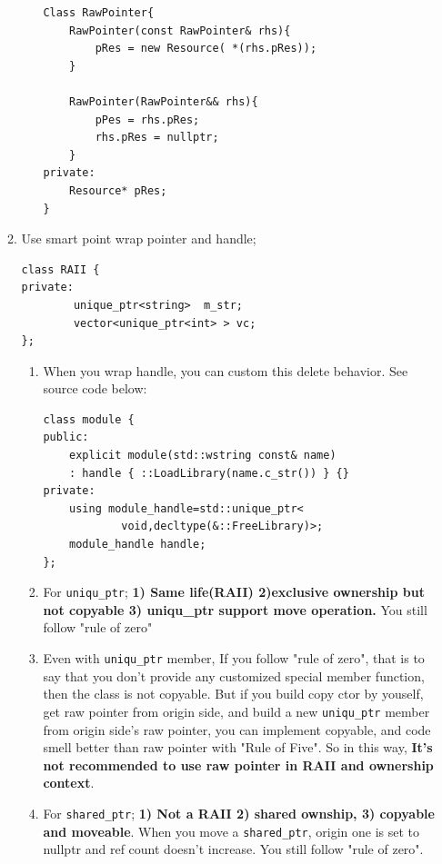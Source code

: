 \documentclass[a4paper,11pt,twoside]{book}
\begin{document}
\begin{itemize}
\begin{enumerate}
\begin{enumerate}
\begin{lstlisting}[numbers=none]
Class RawPointer{
	RawPointer(const RawPointer& rhs){
		pRes = new Resource( *(rhs.pRes));
	}
				
	RawPointer(RawPointer&& rhs){
		pPes = rhs.pRes;
		rhs.pRes = nullptr;
	}
private:
	Resource* pRes;
}
\end{lstlisting}
			\end{enumerate}
		
		\item Use smart point wrap pointer and handle;
\begin{lstlisting}[numbers=none]
class RAII {
private:
		unique_ptr<string>  m_str;
		vector<unique_ptr<int> > vc;
};
		\end{lstlisting}
\begin{enumerate}
	\item  When you wrap handle, you can custom this delete behavior. See source code below:
\begin{lstlisting}[numbers=none]
class module {
public:
	explicit module(std::wstring const& name)
	: handle { ::LoadLibrary(name.c_str()) } {}
private:
	using module_handle=std::unique_ptr<
			void,decltype(&::FreeLibrary)>;
	module_handle handle;
};
\end{lstlisting}
			\item For \texttt{uniqu\_ptr}; \textbf{1) Same life(RAII) 2)exclusive ownership but not copyable 3) uniqu\_ptr support move operation. } You still follow "rule of zero"

			\item Even with \texttt{uniqu\_ptr} member, If you follow "rule of zero", that is to say that you don't provide any customized special member function, then the class is not copyable. But if you build copy ctor by youself, get raw pointer from origin side, and build a new \texttt{uniqu\_ptr} member from origin side's raw pointer, you can implement copyable, and code smell better than raw pointer with "Rule of Five". So in this way, \textbf{It's not recommended to use raw pointer in RAII and ownership context}.

			\item For \texttt{shared\_ptr}; \textbf{1) Not a RAII 2) shared ownship, 3) copyable and moveable}. When you move a \texttt{shared\_ptr}, origin one is set to nullptr and ref count doesn't increase.  You still follow "rule of zero".
\end{enumerate}

	\end{enumerate}


\end{itemize}
\end{document}
